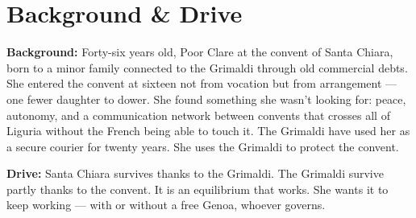 \clearpage



\section*{Background \& Drive}
\begin{rulebox}{}
\textbf{Background:} Forty-six years old, Poor Clare at the convent of Santa Chiara,
born to a minor family connected to the Grimaldi through old commercial debts. She
entered the convent at sixteen not from vocation but from arrangement --- one fewer
daughter to dower. She found something she wasn't looking for: peace, autonomy, and
a communication network between convents that crosses all of Liguria without the
French being able to touch it. The Grimaldi have used her as a secure courier for
twenty years. She uses the Grimaldi to protect the convent.

\medskip\noindent\textcolor{GrimaldiPurple}{\textbf{Drive:}} Santa Chiara survives
thanks to the Grimaldi. The Grimaldi survive partly thanks to the convent. It is an
equilibrium that works. She wants it to keep working --- with or without a free Genoa,
whoever governs.
\end{rulebox}

